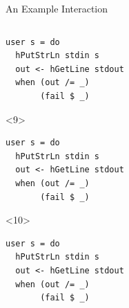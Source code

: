 \documentclass{beamer}
\begin{document}
\begin{frame}[fragile]{An Example Interaction}
\begin{columns}[t]
\begin{column}{0.5\textwidth}
\begin{onlyenv}
\begin{verbatim}
user s = do
  hPutStrLn stdin s
  out <- hGetLine stdout
  when (out /= _)
       (fail $ _)
\end{verbatim}
\end{onlyenv}
\begin{onlyenv}<9>
\begin{verbatim}
user s = do
  hPutStrLn stdin s
  out <- hGetLine stdout
  when (out /= _)
       (fail $ _)
\end{verbatim}
\end{onlyenv}
\begin{onlyenv}<10>
\begin{verbatim}
user s = do
  hPutStrLn stdin s
  out <- hGetLine stdout
  when (out /= _)
       (fail $ _)
\end{verbatim}
\end{onlyenv}
    \end{column}
  \end{columns}
\end{frame}






\end{document}
